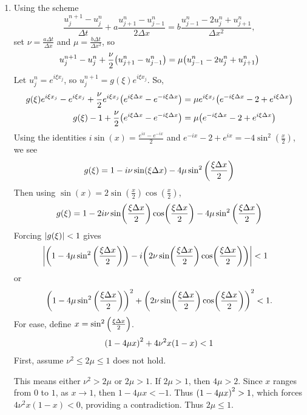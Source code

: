 \documentclass{article} %
\theoremstyle{plain}
\newcommand{\Dx}{\Delta x}
\newcommand{\Dt}{\Delta t}
\numberwithin{equation}{section} %
\numberwithin{figure}{section} %
\numberwithin{table}{section} %
\begin{document}
\begin{enumerate}[\ \ (a)]
    \item
        Using the scheme $$\frac{u_j^{n+1} - u_j^n}{\Dt} + a\frac{u_{j+1}^n - u_{j-1}^n}{2\Dx} = b\frac{u_{j-1}^n - 2u_j^n + u_{j+1}^n}{\Dx^2},$$ set $\nu = \frac{a\Dt}{\Dx}$ and $\mu = \frac{b\Dt}{\Dx^2}$, so
        \begin{align*}
            u_j^{n+1} - u_j^n + \frac{\nu}{2}\qty(u_{j+1}^n - u_{j-1}^n) = \mu\qty(u_{j-1}^n - 2u_j^n + u_{j+1}^n)
        \end{align*}
        Let $u_j^n = e^{i\xi x_j}$, so $u_j^{n+1} = g(\xi)e^{i\xi x_j}$.  So,
        \begin{align*}
            g(\xi)e^{i\xi x_j} - e^{i\xi x_j} + \frac{\nu}{2}e^{i\xi x_j}\qty(e^{i\xi\Dx} - e^{-i\xi\Dx}) &= \mu e^{i\xi x_j}\qty(e^{-i\xi\Dx} - 2 + e^{i\xi\Dx}) \\
            g(\xi) - 1 + \frac{\nu}{2}\qty(e^{i\xi\Dx} - e^{-i\xi\Dx}) &= \mu \qty(e^{-i\xi\Dx} - 2 + e^{i\xi\Dx})
        \end{align*}
        Using the identities $i\sin(x) = \frac{e^{ix} - e^{-ix}}{2}$ and $e^{-ix} - 2 + e^{ix} = -4\sin^2(\frac{x}{2})$, we see
        \begin{align*}
            g(\xi) = 1 - i\nu\sin(\xi\Dx) - 4\mu\sin^2\qty(\frac{\xi\Dx}{2})
        \end{align*}
        Then using $\sin(x) = 2\sin(\frac{x}{2})\cos(\frac{x}{2})$,
        \begin{align*}
            g(\xi) = 1 - 2i\nu\sin(\frac{\xi\Dx}{2})\cos(\frac{\xi\Dx}{2}) - 4\mu\sin^2\qty(\frac{\xi\Dx}{2})
        \end{align*}
        Forcing $\abs{g(\xi)}<1$ gives
        \begin{align*}
            \abs{\qty(1 - 4\mu\sin^2\qty(\frac{\xi\Dx}{2})) - i\qty(2\nu\sin(\frac{\xi\Dx}{2})\cos(\frac{\xi\Dx}{2}))} &< 1
        \end{align*}
        or
        \begin{align*}
            \qty(1 - 4\mu\sin^2\qty(\frac{\xi\Dx}{2}))^2 + \qty(2\nu\sin(\frac{\xi\Dx}{2})\cos(\frac{\xi\Dx}{2}))^2 < 1.
        \end{align*}
        For ease, define $x = \sin^2\qty(\frac{\xi\Dx}{2})$.
        \begin{align*}
            \qty(1 - 4\mu x)^2 + 4\nu^2x(1 - x) < 1
        \end{align*}
        First, assume $\nu^2 \leq 2\mu \leq 1$ does not hold.
        \begin{adjustwidth}{2cm}{2cm}
            This means either $\nu^2 > 2\mu$ or $2\mu > 1$.  If $2\mu > 1$, then $4\mu > 2$.  Since $x$ ranges from $0$ to $1$, as $x\rightarrow 1$, then $1 - 4\mu x < -1$.  Thus $\qty(1 - 4\mu x)^2 > 1$, which forces $4\nu^2 x(1 - x) < 0$, providing a contradiction.  Thus $2\mu \leq 1$.


\end{adjustwidth}
\end{enumerate}
\end{document}
